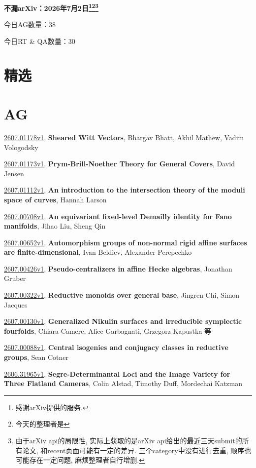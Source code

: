 \documentclass[9pt, a4paper]{article}
\theoremstyle{plain}
\theoremstyle{definition}
\theoremstyle{remark}
\newcommand{\arxiv}[3]{\href{https://arxiv.org/abs/#1}{#1}, \textbf{\textcolor{arxivblue}{#2}}, #3}
\newcommand{\AGnumber}{38}
\newcommand{\RTQAnumber}{30}
\newcommand{\NewestDate}{2026年7月2日}
\newcommand{\todayarXiver}{} %
\begin{document}
\begin{center}
    \Huge\textbf{不漏arXiv：\NewestDate\footnote{感谢arXiv提供的服务.}\footnote{今天的整理者是\todayarXiver}\footnote{由于arXiv api的局限性, 实际上获取的是arXiv api给出的最近三天submit的所有论文, 和recent页面可能有一定的差异. 三个category中没有进行去重, 顺序也可能存在一定问题, 麻烦整理者自行增删.}} \\
\end{center}

\setcounter{section}{-1}

\begin{center}
    今日AG数量：\AGnumber
    
    今日RT \& QA数量：\RTQAnumber
    
\end{center}


\section{精选}


\section{AG}
\arxiv{2607.01178v1}{Sheared Witt Vectors}{Bhargav Bhatt, Akhil Mathew, Vadim Vologodsky}

\arxiv{2607.01173v1}{Prym-Brill-Noether Theory for General Covers}{David Jensen}

\arxiv{2607.01112v1}{An introduction to the intersection theory of the moduli space of curves}{Hannah Larson}

\arxiv{2607.00708v1}{An equivariant fixed-level Demailly identity for Fano manifolds}{Jihao Liu, Sheng Qin}

\arxiv{2607.00652v1}{Automorphism groups of non-normal rigid affine surfaces are finite-dimensional}{Ivan Beldiev, Alexander Perepechko}

\arxiv{2607.00426v1}{Pseudo-centralizers in affine Hecke algebras}{Jonathan Gruber}

\arxiv{2607.00322v1}{Reductive monoids over general base}{Jingren Chi, Simon Jacques}

\arxiv{2607.00130v1}{Generalized Nikulin surfaces and irreducible symplectic fourfolds}{Chiara Camere, Alice Garbagnati, Grzegorz Kapustka 等}

\arxiv{2607.00088v1}{Central isogenies and conjugacy classes in reductive groups}{Sean Cotner}

\arxiv{2606.31965v1}{Segre-Determinantal Loci and the Image Variety for Three Flatland Cameras}{Colin Alstad, Timothy Duff, Mordechai Katzman}
\end{document}

